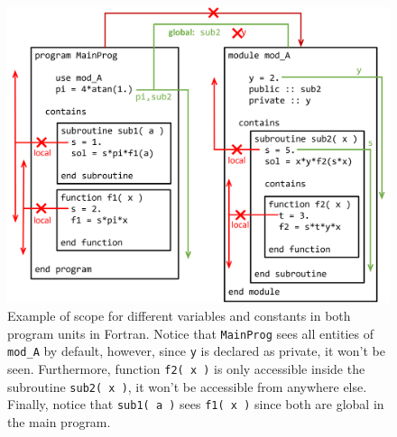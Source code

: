 \begin{figure}[h]
    \centering
    \includegraphics[width= \textwidth]{./doc/Figures/ScopeFor.png}
    \caption{Example of scope for different variables and constants in both program units in Fortran. Notice that \texttt{MainProg} sees all entities of \texttt{mod\_A} by default, however, since \texttt{y} is declared as private, it won't be seen. Furthermore, function \texttt{f2( x )} is only accessible inside the subroutine \texttt{sub2( x )}, it won't be accessible from anywhere else. Finally, notice that \texttt{sub1( a )} sees \texttt{f1( x )} since both are global in the main program.}
    \label{fig:ScopeFor}
\end{figure}














